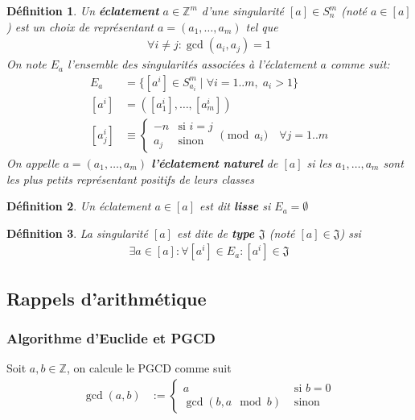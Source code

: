 \documentclass{article}
\newtheorem{definition}{Définition}
\begin{document}
\begin{definition}
    Un \textbf{éclatement} $a \in \mathbb{Z}^m$ d'une singularité $[a] \in S_n^m$ (noté $a \in [a]$) est un choix de 
    représentant $a = (a_1, \dots, a_m)$ tel que
    \begin{align*}
        \forall i \neq j : \gcd(a_i, a_j) = 1
    \end{align*}
    On note $E_a$ l'ensemble des singularités associées à l'éclatement $a$ comme suit:
    \begin{align*}
        E_a & = \{ [a^i] \in S_{a_i}^m \mid \forall i = 1..m,\; a_i > 1 \} \\
        [a^i] & = ([a^i_1], \dots, [a^i_m]) \\
        [a^i_j] & \equiv \begin{cases}
            -n & \text{si $i = j$} \\
            a_j & \text{sinon}
        \end{cases} \pmod{a_i} \quad \forall j = 1..m
    \end{align*}
    On appelle $a = (a_1, \dots, a_m)$ \textbf{l'éclatement naturel} de $[a]$ si 
    les $a_1, \dots, a_m$ sont les plus petits représentant positifs de leurs classes
\end{definition}

\begin{definition}
    Un éclatement $a \in [a]$ est dit \textbf{lisse} si $E_a = \emptyset$
\end{definition}

\begin{definition}
    La singularité $[a]$ est dite de \textbf{type $\mathfrak{J}$} (noté $[a] \in \mathfrak{J}$) ssi
    \begin{align*}
        \exists a \in [a] : \forall [a^i] \in E_a : [a^i] \in \mathfrak{J}
    \end{align*}
\end{definition}

\newpage

\subsection{Rappels d'arithmétique}

\subsubsection{Algorithme d'Euclide et PGCD}

Soit $a, b \in \mathbb{Z}$, on calcule le PGCD comme suit
\begin{align*}
    \gcd(a, b) & := \begin{cases}
        a & \text{ si $b = 0$} \\
        \gcd(b, a \mod b) & \text{ sinon}
    \end{cases}
\end{align*}
\end{document}

